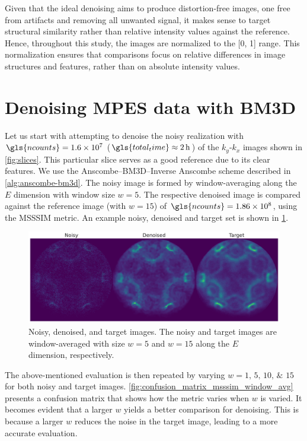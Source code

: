 Given that the ideal denoising aims to produce distortion-free images, one free from artifacts and removing all unwanted signal, it makes sense to target structural similarity rather than relative intensity values against the reference. Hence, throughout this study, the images are normalized to the [\num{0}, \num{1}] range. This normalization ensures that comparisons focus on relative differences in image structures and features, rather than on absolute intensity values.

\section{Denoising MPES data with BM3D}
Let us start with attempting to denoise the noisy realization with $\gls{ncounts}=\num{1.6e7}$ ($\gls{total_time}\approx\qty{2}{h}$) of the $k_y$-$k_x$ images shown in \cref{fig:slices}. This particular slice serves as a good reference due to its clear features. We use the Anscombe--\gls{BM3D}--Inverse Anscombe scheme described in \cref{alg:anscombe-bm3d}. The noisy image is formed by window-averaging along the $E$ dimension with window size $w = 5$. The respective denoised image is compared against the reference image (with $w=15$) of $\gls{ncounts}=\num{1.86e8}$, using the \gls{MSSSIM} metric. An example noisy, denoised and target set is shown in \cref{fig:noisy-denoised-ref-16M-avg-bm3d}. 

\begin{figure}
    \centering
    \includegraphics[width=1\linewidth]{images/noisy_denoised_ref_16M_avg_bm3d.pdf}
    \caption{Noisy, denoised, and target images. The noisy and target images are window-averaged with size $w=5$ and $w=15$ along the $E$ dimension, respectively.}
    \label{fig:noisy-denoised-ref-16M-avg-bm3d}
\end{figure}

The above-mentioned evaluation is then repeated by varying $w = \numlist{1;5;10;15}$ for both noisy and target images. \cref{fig:confusion_matrix_msssim_window_avg} presents a confusion matrix that shows how the metric varies when $w$ is varied. It becomes evident that a larger $w$ yields a better comparison for denoising. This is because a larger $w$ reduces the noise in the target image, leading to a more accurate evaluation.

